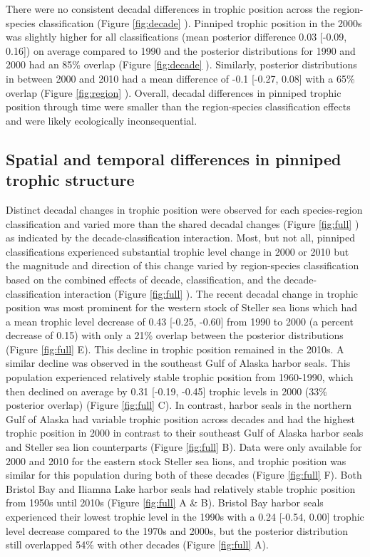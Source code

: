 \documentclass [11pt, proquest] {uwthesis}[2015/03/03]
\begin{document}
There were no consistent decadal differences in trophic position across
the region-species classification (Figure \ref{fig:decade} ). Pinniped
trophic position in the 2000s was slightly higher for all
classifications (mean posterior difference 0.03 {[}-0.09, 0.16{]}) on
average compared to 1990 and the posterior distributions for 1990 and
2000 had an 85\% overlap (Figure \ref{fig:decade} ). Similarly,
posterior distributions in between 2000 and 2010 had a mean difference
of -0.1 {[}-0.27, 0.08{]} with a 65\% overlap (Figure \ref{fig:region}
). Overall, decadal differences in pinniped trophic position through
time were smaller than the region-species classification effects and
were likely ecologically inconsequential.

\subsection{Spatial and temporal differences in pinniped trophic
structure}\label{spatial-and-temporal-differences-in-pinniped-trophic-structure}

Distinct decadal changes in trophic position were observed for each
species-region classification and varied more than the shared decadal
changes (Figure \ref{fig:full} ) as indicated by the
decade-classification interaction. Most, but not all, pinniped
classifications experienced substantial trophic level change in 2000 or
2010 but the magnitude and direction of this change varied by
region-species classification based on the combined effects of decade,
classification, and the decade-classification interaction (Figure
\ref{fig:full} ). The recent decadal change in trophic position was most
prominent for the western stock of Steller sea lions which had a mean
trophic level decrease of 0.43 {[}-0.25, -0.60{]} from 1990 to 2000 (a
percent decrease of 0.15) with only a 21\% overlap between the posterior
distributions (Figure \ref{fig:full} E). This decline in trophic
position remained in the 2010s. A similar decline was observed in the
southeast Gulf of Alaska harbor seals. This population experienced
relatively stable trophic position from 1960-1990, which then declined
on average by 0.31 {[}-0.19, -0.45{]} trophic levels in 2000 (33\%
posterior overlap) (Figure \ref{fig:full} C). In contrast, harbor seals
in the northern Gulf of Alaska had variable trophic position across
decades and had the highest trophic position in 2000 in contrast to
their southeast Gulf of Alaska harbor seals and Steller sea lion
counterparts (Figure \ref{fig:full} B). Data were only available for
2000 and 2010 for the eastern stock Steller sea lions, and trophic
position was similar for this population during both of these decades
(Figure \ref{fig:full} F). Both Bristol Bay and Iliamna Lake harbor
seals had relatively stable trophic position from 1950s until 2010s
(Figure \ref{fig:full} A \& B). Bristol Bay harbor seals experienced
their lowest trophic level in the 1990s with a 0.24 {[}-0.54, 0.00{]}
trophic level decrease compared to the 1970s and 2000s, but the
posterior distribution still overlapped 54\% with other decades (Figure
\ref{fig:full} A).
\end{document}
